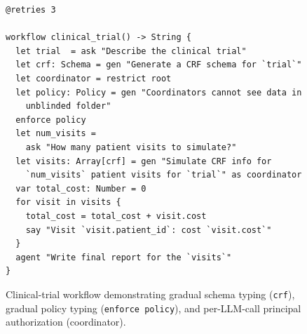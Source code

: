 \begin{figure}[t]
\begin{lstlisting}[language=pact,showstringspaces=false]
@retries 3

workflow clinical_trial() -> String {
  let trial  = ask "Describe the clinical trial"
  let crf: Schema = gen "Generate a CRF schema for `trial`"
  let coordinator = restrict root
  let policy: Policy = gen "Coordinators cannot see data in
    unblinded folder"
  enforce policy
  let num_visits =
    ask "How many patient visits to simulate?"
  let visits: Array[crf] = gen "Simulate CRF info for 
    `num_visits` patient visits for `trial`" as coordinator
  var total_cost: Number = 0
  for visit in visits {
    total_cost = total_cost + visit.cost
    say "Visit `visit.patient_id`: cost `visit.cost`"
  }
  agent "Write final report for the `visits`"
}
\end{lstlisting}
\caption{Clinical-trial workflow demonstrating gradual schema typing (\texttt{crf}), gradual policy typing (\texttt{enforce policy}), and per-LLM-call principal authorization (coordinator).}
\label{fig:clinical-trial}
\end{figure}
